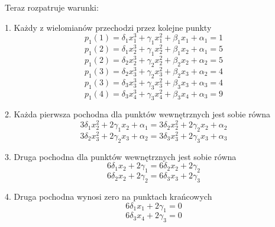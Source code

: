 \documentclass[varwidth,12pt,a4paper]{article}
\begin{document}
Teraz rozpatruje warunki:

1. Każdy z wielomianów przechodzi przez kolejne punkty
\begin{equation}
    p_1(1) = \delta _1 x_1^3 + \gamma _1 x_1^2 + \beta _1 x_1 + \alpha _1 = 1
\end{equation}
\begin{equation}
    p_1(2) = \delta _1 x_2^3 + \gamma _1 x_2^2 + \beta _1 x_2 + \alpha _1 = 5
\end{equation}
\begin{equation}
    p_1(2) = \delta _2 x_2^3 + \gamma _2 x_2^2 + \beta _2 x_2 + \alpha _2 = 5
\end{equation}
\begin{equation}
    p_1(3) = \delta _2 x_3^3 + \gamma _2 x_3^2 + \beta _2 x_3 + \alpha _2 = 4
\end{equation}
\begin{equation}
    p_1(3) = \delta _3 x_3^3 + \gamma _3 x_3^2 + \beta _3 x_3 + \alpha _3 = 4
\end{equation}
\begin{equation}
    p_1(4) = \delta _3 x_4^3 + \gamma _3 x_4^2 + \beta _3 x_4 + \alpha _3 = 9
\end{equation}

2. Każda pierwsza pochodna dla punktów wewnętrznych jest sobie równa
\begin{equation}
    3 \delta _1 x_2 ^2 + 2 \gamma _1 x_2 + \alpha _1 = 3 \delta _2 x_2 ^2 + 2 \gamma _2 x_2 + \alpha _2
\end{equation}
\begin{equation}
    3 \delta _2 x_3 ^2 + 2 \gamma _2 x_3 + \alpha _2 = 3 \delta _3 x_3 ^2 + 2 \gamma _3 x_3 + \alpha _3
\end{equation}

3. Druga pochodna dla punktów wewnętrznych jest sobie równa
\begin{equation}
    6\delta _1 x_2 + 2 \gamma _1 = 6 \delta _2 x_2 + 2 \gamma _2
\end{equation}
\begin{equation}
    6\delta _2 x_2 + 2 \gamma _2 = 6 \delta _3 x_3 + 2 \gamma _3
\end{equation}

4. Druga pochodna wynosi zero na punktach krańcowych
\begin{equation}
    6\delta _1 x_1 + 2 \gamma _1 = 0
\end{equation}
\begin{equation}
    6\delta _3 x_4 + 2 \gamma _3 = 0
\end{equation}
\end{document}
